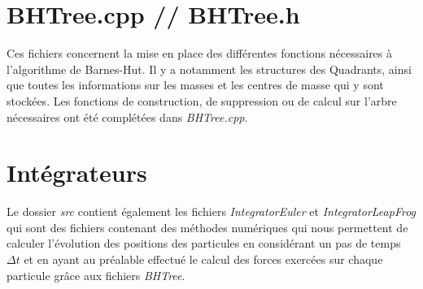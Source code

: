 \section{BHTree.cpp // BHTree.h}
Ces fichiers concernent la mise en place des différentes fonctions nécessaires à l'algorithme de Barnes-Hut. Il y a notamment les structures des Quadrants, ainsi que toutes les informations sur les masses et les centres de masse qui y sont stockées. Les fonctions de construction, de suppression ou de calcul sur l'arbre nécessaires ont été complétées dans \textit{BHTree.cpp}.

\section{Intégrateurs}
Le dossier \textit{src} contient également les fichiers \textit{IntegratorEuler} et \textit{IntegratorLeapFrog} qui sont des fichiers contenant des méthodes numériques qui nous permettent de calculer l'évolution des positions des particules en considérant un pas de temps \textit{$\Delta t$} et en ayant au préalable effectué le calcul des forces exercées sur chaque particule grâce aux fichiers \textit{BHTree}.

